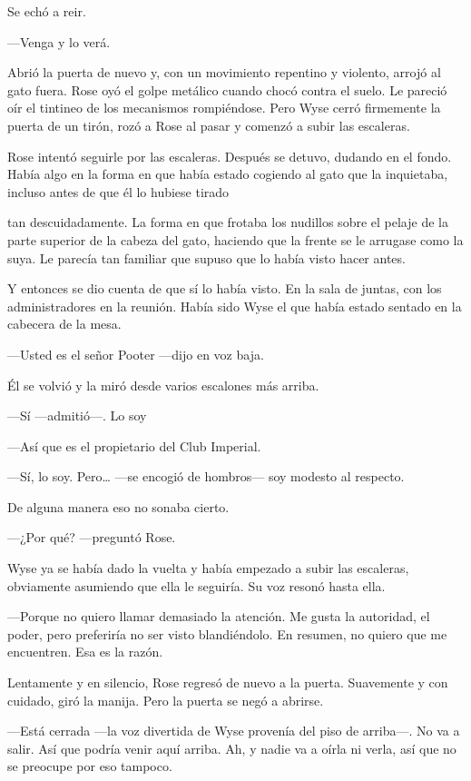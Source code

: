 {Se echó a reir.}

{---Venga y lo verá.}

{Abrió la puerta de nuevo y, con un movimiento repentino y violento,
	arrojó al gato fuera. Rose oyó el golpe metálico cuando chocó contra el
	suelo. Le pareció oír el tintineo de los mecanismos rompiéndose. Pero
	Wyse cerró firmemente la puerta de un tirón, rozó a Rose al pasar y
comenzó a subir las escaleras.}

{Rose intentó seguirle por las escaleras. Después se detuvo, dudando en
	el fondo. Había algo en la forma en que había estado cogiendo al gato
que la inquietaba, incluso antes de que él lo hubiese tirado}

{tan descuidadamente. La forma en que frotaba los nudillos sobre el
	pelaje de la parte superior de la cabeza del gato, haciendo que la
	frente se le arrugase como la suya. Le parecía tan familiar que supuso
que lo había visto hacer antes.}

{Y entonces se dio cuenta de que sí lo había visto. En la sala de
	juntas, con los administradores en la reunión. Había sido Wyse el que
había estado sentado en la cabecera de la mesa.}

{---Usted es el señor Pooter ---dijo en voz baja.}

{Él se volvió y la miró desde varios escalones más arriba.}

{---Sí ---admitió---. Lo soy}

{---Así que es el propietario del Club Imperial.}

{---Sí, lo soy. Pero\ldots{} ---se encogió de hombros--- soy modesto al
respecto.}

{De alguna manera eso no sonaba cierto.}

{---¿Por qué? ---preguntó Rose.}

{Wyse ya se había dado la vuelta y había empezado a subir las escaleras,
obviamente asumiendo que ella le seguiría. Su voz resonó hasta ella.}

{---Porque no quiero llamar demasiado la atención. Me gusta la
	autoridad, el poder, pero preferiría no ser visto blandiéndolo. En
resumen, no quiero que me encuentren. Esa es la razón.}

{Lentamente y en silencio, Rose regresó de nuevo a la puerta. Suavemente
y con cuidado, giró la manija. Pero la puerta se negó a abrirse.}

{---Está cerrada ---la voz divertida de Wyse provenía del piso de
	arriba---. No va a salir. Así que podría venir aquí arriba. Ah, y nadie
va a oírla ni verla, así que no se preocupe por eso tampoco.}

